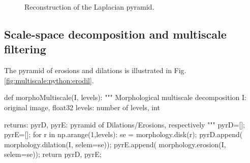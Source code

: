 \begin{figure}[htbp]
\centering\caption{Reconstruction of the Laplacian pyramid.}%
 \hfill
 \label{fig:multiscale:python:nodetails}
\end{figure}


\subsection{Scale-space decomposition and multiscale filtering}
The pyramid of erosions and dilations is illustrated in Fig.\ref{fig:multiscale:python:erodil}.
\begin{python}
def morphoMultiscale(I, levels):
    """
    Morphological multiscale decomposition
    I: original image, float32
    levels: number of levels, int
    
    returns: pyrD, pyrE: pyramid of Dilations/Erosions, respectively
    """
    pyrD=[];
    pyrE=[];
    for r in np.arange(1,levels):
        se = morphology.disk(r);
        pyrD.append( morphology.dilation(I, selem=se));
        pyrE.append( morphology.erosion(I, selem=se));
    return pyrD, pyrE;
\end{python}


